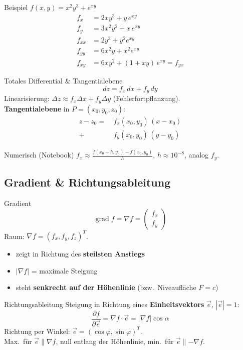 \documentclass[a4paper, fontsize=7pt]{scrartcl}
\newcommand{\pdn}[2]{\frac{\partial #1}{\partial #2}}
\begin{document}
\begin{subbox}{Beispiel}
$f(x, y) = x^2 y^3 + e^{xy}$
\begin{align*}
f_x &= 2xy^3 + y\,e^{xy}\\
f_y &= 3x^2y^2 + x\,e^{xy}\\
f_{xx} &= 2y^3 + y^2 e^{xy}\\
f_{yy} &= 6x^2 y + x^2 e^{xy}\\
f_{xy} &= 6xy^2 + (1 + xy)\,e^{xy} = f_{yx}
\end{align*}
\end{subbox}

\begin{mainbox}{Totales Differential \& Tangentialebene}
$$dz = f_x\, dx + f_y\, dy$$
Linearisierung: $\Delta z \approx f_x \Delta x + f_y \Delta y$
(Fehlerfortpflanzung).\\
\textbf{Tangentialebene} in $P = (x_0, y_0, z_0)$:
\begin{align*}
z - z_0 = \ &f_x(x_0, y_0)\,(x - x_0)\\
 + \ &f_y(x_0, y_0)\,(y - y_0)
\end{align*}
\end{mainbox}

\begin{subbox}{Numerisch (Notebook)}
$f_x \approx \frac{f(x_0 + h, y_0) - f(x_0, y_0)}{h}$, $h \approx 10^{-8}$,
analog $f_y$.
\end{subbox}

\subsection{Gradient \& Richtungsableitung}

\begin{mainbox}{Gradient}
$$\operatorname{grad} f = \nabla f = \begin{pmatrix} f_x \\ f_y \end{pmatrix}$$
Raum: $\nabla f = (f_x, f_y, f_z)^T$.
\begin{itemize}
    \item zeigt in Richtung des \textbf{steilsten Anstiegs}
    \item $|\nabla f|$ = maximale Steigung
    \item steht \textbf{senkrecht auf der Höhenlinie}
          (bzw.\ Niveaufläche $F = c$)
\end{itemize}
\end{mainbox}

\begin{mainbox}{Richtungsableitung}
Steigung in Richtung eines \textbf{Einheitsvektors} $\vec e$, $|\vec e| = 1$:
$$\pdn{f}{\vec e} = \nabla f \cdot \vec e = |\nabla f| \cos\alpha$$
Richtung per Winkel: $\vec e = (\cos\varphi, \sin\varphi)^T$.\\
Max.\ für $\vec e \parallel \nabla f$, null entlang der Höhenlinie,
min.\ für $\vec e \parallel -\nabla f$.
\end{mainbox}
\end{document}

